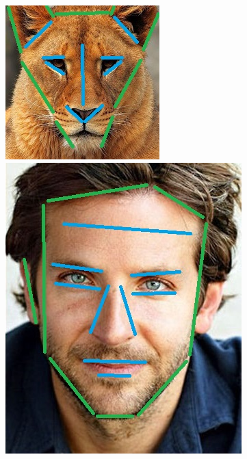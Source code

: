 \documentclass[conference]{IEEEtran}
\begin{document}
\begin{figure}[H]
\begin{multicols}{2}
    \centering
    \includegraphics[width=0.98\linewidth]{cats/cat1 lines.jpg} \par
    \includegraphics[width=0.98\linewidth]{faces/face1 lines.jpg} \par

\end{multicols}
\end{figure}
\end{document}
